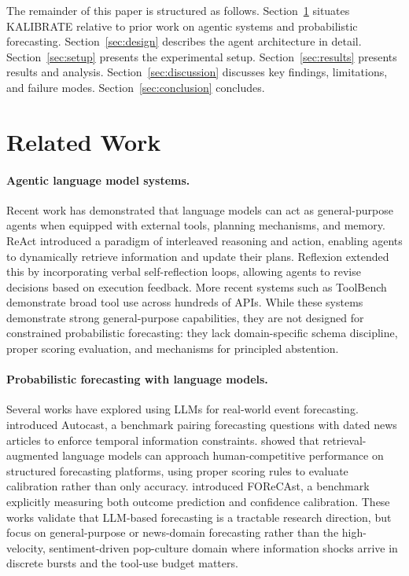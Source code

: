 \documentclass{article} %
\newcommand{\agentname}{KALIBRATE}
\begin{document}
The remainder of this paper is structured as follows. Section~\ref{sec:related} situates \agentname{} relative to prior work on agentic systems and probabilistic forecasting. Section~\ref{sec:design} describes the agent architecture in detail. Section~\ref{sec:setup} presents the experimental setup. Section~\ref{sec:results} presents results and analysis. Section~\ref{sec:discussion} discusses key findings, limitations, and failure modes. Section~\ref{sec:conclusion} concludes.

\section{Related Work}
\label{sec:related}

\paragraph{Agentic language model systems.}
Recent work has demonstrated that language models can act as general-purpose agents when equipped with external tools, planning mechanisms, and memory. ReAct \citep{yao2023react} introduced a paradigm of interleaved reasoning and action, enabling agents to dynamically retrieve information and update their plans. Reflexion \citep{shinn2023reflexion} extended this by incorporating verbal self-reflection loops, allowing agents to revise decisions based on execution feedback. More recent systems such as ToolBench \citep{qin2023toolllm} demonstrate broad tool use across hundreds of APIs. While these systems demonstrate strong general-purpose capabilities, they are not designed for constrained probabilistic forecasting: they lack domain-specific schema discipline, proper scoring evaluation, and mechanisms for principled abstention.

\paragraph{Probabilistic forecasting with language models.}
Several works have explored using LLMs for real-world event forecasting. \citet{zou2022forecasting} introduced Autocast, a benchmark pairing forecasting questions with dated news articles to enforce temporal information constraints. \citet{halawi2024approaching} showed that retrieval-augmented language models can approach human-competitive performance on structured forecasting platforms, using proper scoring rules to evaluate calibration rather than only accuracy. \citet{yuan2025forecast} introduced FOReCAst, a benchmark explicitly measuring both outcome prediction and confidence calibration. These works validate that LLM-based forecasting is a tractable research direction, but focus on general-purpose or news-domain forecasting rather than the high-velocity, sentiment-driven pop-culture domain where information shocks arrive in discrete bursts and the tool-use budget matters.
\end{document}
